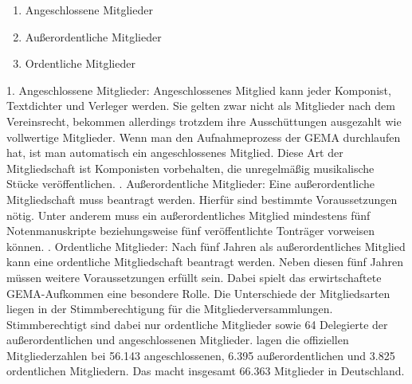 \begin{enumerate}
\item Angeschlossene Mitglieder
\item Außerordentliche Mitglieder
\item Ordentliche Mitglieder
\end{enumerate}

1. Angeschlossene Mitglieder:
\newline
Angeschlossenes Mitglied kann jeder Komponist, Textdichter und Verleger werden. Sie gelten zwar nicht als Mitglieder nach dem Vereinsrecht, bekommen allerdings trotzdem ihre Ausschüttungen ausgezahlt wie vollwertige Mitglieder. Wenn man den Aufnahmeprozess der GEMA durchlaufen hat, ist man automatisch ein angeschlossenes Mitglied. Diese Art der Mitgliedschaft ist Komponisten vorbehalten, die unregelmäßig musikalische Stücke veröffentlichen.
\newline
{}. Außerordentliche Mitglieder:
\newline
Eine außerordentliche Mitgliedschaft muss beantragt werden. Hierfür sind bestimmte Voraussetzungen nötig. Unter anderem muss ein außerordentliches Mitglied mindestens fünf Notenmanuskripte beziehungsweise fünf veröffentlichte Tonträger vorweisen können.
\newline
{}. Ordentliche Mitglieder:
\newline
Nach fünf Jahren als außerordentliches Mitglied kann eine ordentliche Mitgliedschaft beantragt werden. Neben diesen fünf Jahren müssen weitere Voraussetzungen erfüllt sein. Dabei spielt das erwirtschaftete GEMA-Aufkommen eine besondere Rolle. 
\newline 
\newline
Die Unterschiede der Mitgliedsarten liegen in der Stimmberechtigung für die Mitgliederversammlungen. Stimmberechtigt sind dabei nur ordentliche Mitglieder sowie 64 Delegierte der außerordentlichen und angeschlossenen Mitglieder.
 lagen die offiziellen Mitgliederzahlen bei 56.143 angeschlossenen, 6.395 außerordentlichen und 3.825 ordentlichen Mitgliedern. Das macht insgesamt 66.363 Mitglieder in Deutschland.

